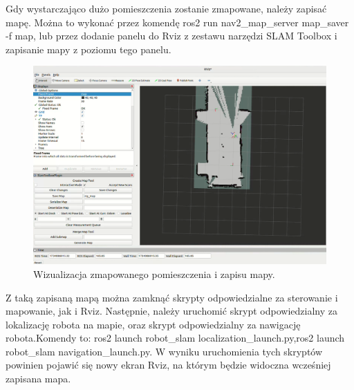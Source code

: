 \documentclass[a4paper,twoside,12pt]{book}
\begin{document}
\newpage
Gdy wystarczająco dużo pomieszczenia zostanie zmapowane, należy zapisać mapę. Można to wykonać przez komendę ros2 run nav2\_map\_server map\_saver -f map, lub przez dodanie panelu do Rviz z zestawu narzędzi SLAM Toolbox i zapisanie mapy z poziomu tego panelu.

\begin{figure}[!hb]
	\centering
	\includegraphics[width=1\textwidth]{images/save-map.png}
	\caption{Wizualizacja zmapowanego pomieszczenia i zapisu mapy.}
	\label{fig:save-map}
\end{figure}
\newpage
Z taką zapisaną mapą można zamknąć skrypty odpowiedzialne za sterowanie i mapowanie, jak i Rviz.
\newline\newline
Następnie, należy uruchomić skrypt odpowiedzialny za lokalizację robota na mapie, oraz skrypt odpowiedzialny za nawigację robota.\newline Komendy to: ros2 launch robot\_slam localization\_launch.py,\newline ros2 launch robot\_slam navigation\_launch.py. 
W wyniku uruchomienia tych skryptów powinien pojawić się nowy ekran Rviz, na którym będzie widoczna wcześniej zapisana mapa.
\end{document}
